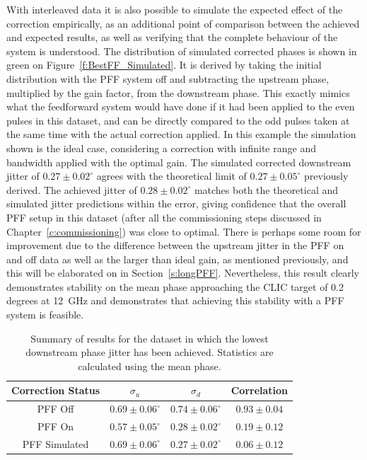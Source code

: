 With interleaved data it is also possible to simulate the expected effect of the correction empirically, as an additional point of comparison between the achieved and expected results, as well as verifying that the complete behaviour of the system is understood. The distribution of simulated corrected phases is shown in green on Figure~\ref{f:BestFF_Simulated}. It is derived by taking the initial distribution with the PFF system off and subtracting the upstream phase, multiplied by the gain factor, from the downstream phase. This exactly mimics what the feedforward system would have done if it had been applied to the even pulses in this dataset, and can be directly compared to the odd pulses taken at the same time with the actual correction applied. In this example the simulation shown is the ideal case, considering a correction with infinite range and bandwidth applied with the optimal gain. The simulated corrected downstream jitter of \(0.27\pm0.02^\circ\) agrees with the theoretical limit of \(0.27\pm0.05^\circ\) previously derived. The achieved jitter of \(0.28\pm0.02^\circ\) matches both the theoretical and simulated jitter predictions within the error, giving confidence that the overall PFF setup in this dataset (after all the commissioning steps discussed in Chapter~\ref{c:commissioning}) was close to optimal. There is perhaps some room for improvement due to the difference between the upstream jitter in the PFF on and off data as well as the larger than ideal gain, as mentioned previously, and this will be elaborated on in Section~\ref{s:longPFF}. Nevertheless, this result clearly demonstrates stability on the mean phase approaching the CLIC target of 0.2 degrees at 12~GHz and demonstrates that achieving this stability with a PFF system is feasible.




\begin{table}
  \begin{center}
    \begin{tabular}{| c c c c |}
	   \hline
       Correction Status & \(\sigma_u\) & \(\sigma_d\) & Correlation \\ \hline
       PFF Off & \(0.69\pm0.06^\circ\) & \(0.74\pm0.06^\circ\) & \(0.93\pm0.04\) \\
	   PFF On & \(0.57\pm0.05^\circ\) & \(0.28\pm0.02^\circ\) & \(0.19\pm0.12\) \\
	   PFF Simulated & \(0.69\pm0.06^\circ\) & \(0.27\pm0.02^\circ\) & \(0.06\pm0.12\) \\ \hline
    \end{tabular}
    \caption{Summary of results for the dataset in which the lowest downstream phase jitter has been achieved. Statistics are calculated using the mean phase.}
  	\label{t:BestFF}
  \end{center}
\end{table}



